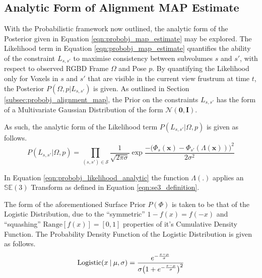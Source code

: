 \subsection{Analytic Form of Alignment MAP Estimate}
\label{subsec:probobj_analytic_alignment_map}
With the Probabilistic framework now outlined, the analytic form of the
Posterior given in Equation \ref{eqn:probobj_map_estimate} may be explored. The
Likelihood term in Equation \ref{eqn:probobj_map_estimate} quantifies the
ability of the constraint $L_{s, s'}$ to maximise consistency between subvolumes
$s$ and $s'$, with respect to observed RGBD Frame $\Omega$ and Pose $p$. By
quantifying the Likelihood only for Voxels in $s$ and $s'$ that are visible in
the current view frustrum at time $t$, the Posterior $P(\Omega, p | L_{s, s'})$
is given. As outlined in Section \ref{subsec:probobj_alignment_map}, the Prior
on the constraints $L_{s, s'}$ has the form of a Multivariate Gaussian
Distribution of the form $\mathcal{N}(\mathbf{0}, \mathbf{I})$.

As such, the analytic form of the Likelihood term $P(L_{s, s'} | \Omega, p)$ is
given as follows.
\begin{equation}
  \label{eqn:probobj_likelihood_analytic}
  P(L_{s, s'} | \Omega, p) = \prod_{(s, s') \in \mathcal{S}}
  \frac{1}{\sqrt{2 \pi \sigma}}
  \exp{\frac{-\big(\Phi_{s}(\mathbf{x}) - \Phi_{s'}(\Lambda(\mathbf{x}))\big)^{2}}
  {2\sigma^{2}}}
\end{equation}

In Equation \ref{eqn:probobj_likelihood_analytic} the function $\Lambda(.)$
applies an $\mathbb{SE}(3)$ Transform as defined in Equation
\ref{eqn:se3_definition}.

The form of the aforementioned Surface Prior $P(\Phi)$ is taken to be that of
the Logistic Distribution, due to the ``symmetric'' $1 - f(x) = f(-x)$
and ``squashing'' $\text{Range}[f(x)] = [0, 1]$ properties of it's Cumulative
Density Function. The Probability Density Function of the Logistic Distribution
is given as follows.
\begin{equation}
  \label{eqn:probobj_logistic_dist}
  \text{Logistic}(x \:\vert\: \mu, \sigma) = \frac
  {e^{-\frac{x - \mu}{\sigma}}}
  {\sigma \big( 1 + e^{-\frac{x - \mu}{\sigma}} \big)^{2}}
\end{equation}

